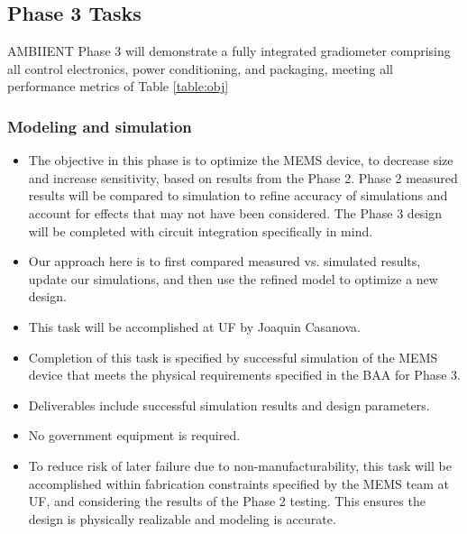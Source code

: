 \subsection{Phase 3 Tasks}
AMBIIENT Phase 3 will demonstrate a fully integrated gradiometer comprising all control
electronics, power conditioning, and packaging, meeting all performance metrics of Table  \ref{table:obj}

\subsubsection{Modeling and simulation}\label{sec:p3:em}
\begin{itemize}
\item The objective in this phase is to optimize the MEMS device, to decrease size and increase sensitivity, based on results from the Phase 2. Phase 2 measured results will be compared to simulation to refine accuracy of simulations and account for effects that may not have been considered. The Phase 3 design will be completed with circuit integration specifically in mind.
\item Our approach here is to first compared measured vs. simulated results, update our simulations, and then use the refined model to optimize a new design.
\item This task will be accomplished at UF by Joaquin Casanova.
\item Completion of this task is specified by successful simulation of the MEMS device that meets the physical requirements specified in the BAA for Phase 3.
\item Deliverables include successful simulation results and design parameters.
\item No government equipment is required.
\item To reduce risk of later failure due to non-manufacturability, this task will be accomplished within fabrication constraints specified by the MEMS team at UF, and considering the results of the Phase 2 testing. This ensures the design is physically realizable and modeling is accurate.
\end{itemize}

